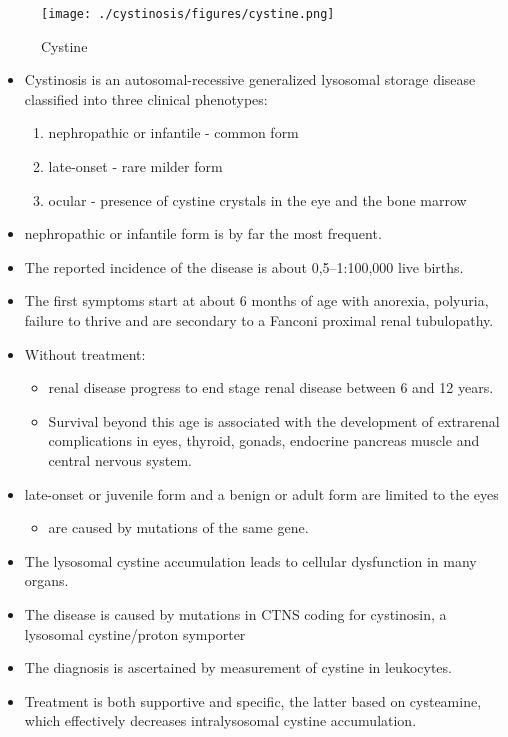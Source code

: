 \documentclass{scrartcl}
\begin{document}
\begin{figure}[htbp]
\centering
\texttt{[image: ./cystinosis/figures/cystine.png]}
\caption{\label{fig:org242e824}
Cystine}
\end{figure}

\begin{itemize}
\item Cystinosis is an autosomal-recessive generalized lysosomal storage
disease classified into three clinical phenotypes:
\begin{enumerate}
\item nephropathic or infantile - common form
\item late-onset - rare milder form
\item ocular - presence of cystine crystals in the eye and the bone
marrow
\end{enumerate}
\item nephropathic or infantile form is by far the most frequent.
\item The reported incidence of the disease is about 0,5–1:100,000 live births.
\item The first symptoms start at about 6 months of age with anorexia,
polyuria, failure to thrive and are secondary to a Fanconi proximal
renal tubulopathy.
\item Without treatment:
\begin{itemize}
\item renal disease progress to end stage renal disease between 6 and 12 years.
\item Survival beyond this age is associated with the development of
extrarenal complications in eyes, thyroid, gonads, endocrine
pancreas muscle and central nervous system.
\end{itemize}
\item late-onset or juvenile form and a benign or adult form are limited to the eyes
\begin{itemize}
\item are caused by mutations of the same gene.
\end{itemize}
\item The lysosomal cystine accumulation leads to cellular dysfunction in many organs.
\item The disease is caused by mutations in CTNS coding for cystinosin, a
lysosomal cystine/proton symporter
\item The diagnosis is ascertained by measurement of cystine in leukocytes.
\item Treatment is both supportive and specific, the latter based on
cysteamine, which effectively decreases intralysosomal cystine
accumulation.
\end{itemize}
\end{document}

